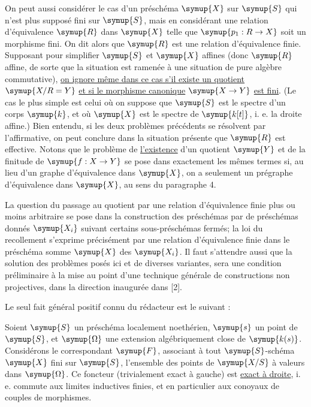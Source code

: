 On peut aussi considérer le cas d'un préschéma $\symup{X}$ sur $\symup{S}$ qui n'est plus
supposé fini sur $\symup{S}$, mais en considérant une relation d'équivalence $\symup{R}$ dans
$\symup{X}$ telle que $\symup{p_1:R\to X}$ soit un morphisme fini. On dit alors
que $\symup{R}$ est une relation d'équivalence finie. Supposant pour simplifier $\symup{S}$ et
$\symup{X}$ affines (donc $\symup{R}$ affine, de sorte que la situation est ramenée à une
situation de pure algèbre commutative), \uline{on ignore même dans ce cas s'il
existe un quotient} $\symup{X/R=Y}$ \uline{et si le morphisme canonique}
$\symup{X\to Y}$ \uline{est fini}. (Le cas le plus simple est celui où on
suppose que $\symup{S}$ est le spectre d'un corps $\symup{k}$, et où $\symup{X}$ est le spectre de
$\symup{k[t]}$, i. e. la droite affine.) Bien entendu, si les deux problèmes précédents
se résolvent par l'affirmative, on peut conclure dans la situation présente que
$\symup{R}$ est effective. Notons que le problème de \uline{l'existence} d'un quotient
$\symup{Y}$ et de la finitude de $\symup{f:X\to Y}$ se pose dans exactement les
mêmes termes si, au lieu d'un graphe d'équivalence dans $\symup{X}$, on a seulement un
prégraphe d'équivalence dans $\symup{X}$, au sens du paragraphe 4.

La question du passage au quotient par une relation d'équivalence finie plus
ou moins arbitraire se pose dans la construction des préschémas par
 de préschémas donnés $\symup{X_i}$ suivant certains sous-préschémas
fermés; la loi du recollement s'exprime précisément par une relation
d'équivalence finie dans le préschéma somme $\symup{X}$ des $\symup{X_i}$. Il faut s'attendre
aussi que la solution des problèmes posés ici et de diverses variantes, sera
une condition préliminaire à la mise au point d'une technique générale de
constructions non projectives, dans la direction inaugurée dans [2].

Le seul fait général positif connu du rédacteur est le suivant :

 Soient $\symup{S}$ un préschéma localement noethérien, $\symup{s}$
un point de $\symup{S}$, et $\symup{\Omega}$ une extension algébriquement close de $\symup{k(s)}$.
Considérons le
 correspondant $\symup{F}$, associant à tout $\symup{S}$-schéma
$\symup{X}$ fini sur $\symup{S}$, l'ensemble des points de $\symup{X/S}$ à valeurs dans $\symup{\Omega}$. Ce
foncteur (trivialement exact à gauche) est \uline{exact à droite}, i. e. commute
aux limites inductives finies, et en particulier aux conoyaux de couples de
morphismes.

